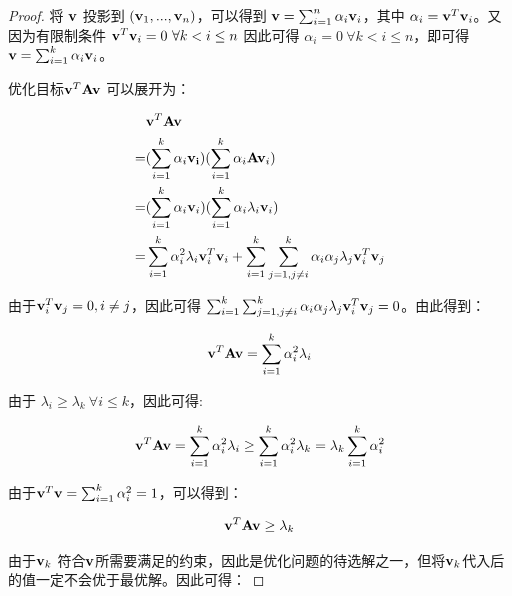 \begin{proof}
将 ${\bf v}$ 投影到 $({\bf v}_1,...,{\bf v}_n)$，可以得到 ${\bf v} = \sum_{i=1}^{n} \alpha_i {\bf v}_i$，其中 $\alpha_i = {\bf v}^T{\bf v}_i$。又因为有限制条件 ${\bf v}^T{\bf v}_i=0\ \forall k<i\leq n$ 因此可得 $\alpha_i = 0\  \forall k<i\leq n$，即可得${\bf v} = \sum_{i=1}^{k} \alpha_i {\bf v}_i$。

优化目标${\bf v}^T{\bf A}{\bf v}$ 可以展开为：

\begin{equation*}
\begin{split}
 & {\bf v}^T{\bf A}{\bf v}\\
 =& (\sum_{i=1}^{k} \alpha_i {\bf v_i})(\sum_{i=1}^{k} \alpha_i {\bf A}{\bf v}_i)\\
 =& (\sum_{i=1}^{k} \alpha_i {\bf v}_i)(\sum_{i=1}^{k} \alpha_i \lambda_i  {\bf v}_i)\\
 =& \sum_{i=1}^{k} \alpha_i^2 \lambda_i {\bf v}_i^T {\bf v}_i + \sum_{i=1}^{k} \sum_{j=1,j \neq i}^{k} \alpha_i \alpha_j \lambda_j {\bf v}_i^T {\bf v}_j
\end{split}
\end{equation*}

由于${\bf v}_i^T{\bf v}_j=0, i \neq j$，因此可得 $\sum_{i=1}^{k} \sum_{j=1,j \neq i}^{k} \alpha_i \alpha_j \lambda_j {\bf v}_i^T {\bf v}_j = 0$。由此得到：

\begin{equation}
\label{equa:vAv}
{\bf v}^T{\bf A}{\bf v} = \sum_{i=1}^{k} \alpha_i^2 \lambda_i
\end{equation}

由于 $\lambda_i \geq \lambda_k \ \forall i\leq k$，因此可得:

\begin{equation*}
\begin{split}
	{\bf v}^T{\bf A}{\bf v} = \sum_{i=1}^{k} \alpha_i^2 \lambda_i \geq \sum_{i=1}^{k} \alpha_i^2 \lambda_k = \lambda_k  \sum_{i=1}^{k} \alpha_i^2
\end{split}
\end{equation*}

由于${\bf v}^T{\bf v} = \sum_{i=1}^{k} \alpha_i^2 = 1$，可以得到：

\begin{equation}
\label{equa:geq}
	{\bf v}^T{\bf A}{\bf v} \geq \lambda_k 
\end{equation}

由于${\bf v}_k$ 符合${\bf v}$所需要满足的约束，因此是优化问题的待选解之一，但将${\bf v}_k$代入后的值一定不会优于最优解。因此可得：


\end{proof}
